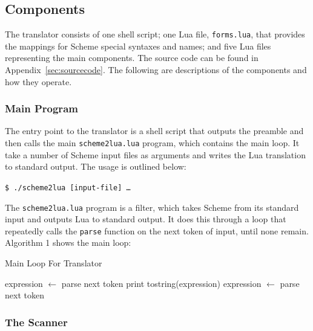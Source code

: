 \subsection{Components}

The translator consists of one shell script; one Lua file, \texttt{forms.lua},
that provides the mappings for Scheme special syntaxes and names; and five Lua
files representing the main components. The source code can be found in
Appendix~\ref{sec:sourcecode}. The following are descriptions of the components
and how they operate.

\subsubsection{Main Program}

The entry point to the translator is a shell script that outputs the preamble
and then calls the main \texttt{scheme2lua.lua} program, which contains the main
loop. It take a number of Scheme input files as arguments and writes the Lua
translation to standard output. The usage is outlined below:

\begin{framed}
\texttt{\$ ./scheme2lua [input-file] \ldots}
\end{framed}

The \texttt{scheme2lua.lua} program is a filter, which takes Scheme from its
standard input and outputs Lua to standard output. It does this through a loop
that repeatedly calls the \texttt{parse} function on the next token of input,
until none remain. Algorithm 1 shows the main loop:

\begin{algorithm}
\caption{Main Loop For Translator}
\label{alg:mainloop}
\begin{algorithmic}
\STATE expression $\leftarrow$ parse next token  
\STATE print tostring(expression)
\STATE expression $\leftarrow$ parse next token
\ENDWHILE
\end{algorithmic}
\end{algorithm}

\subsubsection{The Scanner}

